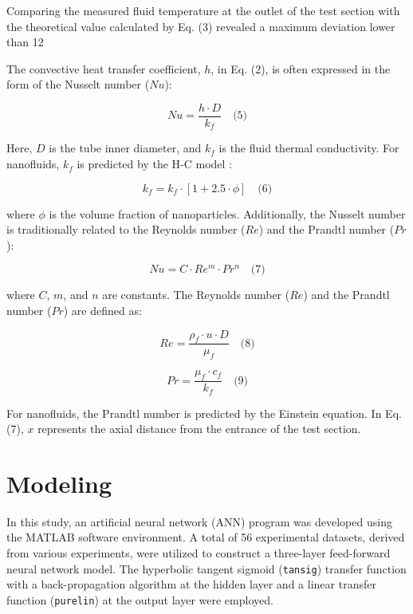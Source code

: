 \documentclass{article}
\begin{document}
Comparing the measured fluid temperature at the outlet of the test section with the theoretical value calculated by Eq. (3) revealed a maximum deviation lower than 12%

The convective heat transfer coefficient, $h$, in Eq. (2), is often expressed in the form of the Nusselt number ($Nu$):

\begin{equation}
Nu = \frac{h \cdot D}{k_f} \quad \text{(5)}
\end{equation}

Here, $D$ is the tube inner diameter, and $k_f$ is the fluid thermal conductivity. For nanofluids, $k_f$ is predicted by the H-C model \cite{ref8}:

\begin{equation}
k_f = k_f \cdot [1 + 2.5 \cdot \phi] \quad \text{(6)}
\end{equation}

where $\phi$ is the volume fraction of nanoparticles. Additionally, the Nusselt number is traditionally related to the Reynolds number ($Re$) and the Prandtl number ($Pr$):

\begin{equation}
Nu = C \cdot Re^m \cdot Pr^n \quad \text{(7)}
\end{equation}

where $C$, $m$, and $n$ are constants. The Reynolds number ($Re$) and the Prandtl number ($Pr$) are defined as:

\begin{equation}
Re = \frac{\rho_f \cdot u \cdot D}{\mu_f} \quad \text{(8)}
\end{equation}

\begin{equation}
Pr = \frac{\mu_f \cdot c_f}{k_f} \quad \text{(9)}
\end{equation}

For nanofluids, the Prandtl number is predicted by the Einstein equation. In Eq. (7), $x$ represents the axial distance from the entrance of the test section.



\section{Modeling}

In this study, an artificial neural network (ANN) program was developed using the MATLAB software environment. A total of 56 experimental datasets, derived from various experiments, were utilized to construct a three-layer feed-forward neural network model. The hyperbolic tangent sigmoid (\texttt{tansig}) transfer function with a back-propagation algorithm at the hidden layer and a linear transfer function (\texttt{purelin}) at the output layer were employed.
\end{document}
